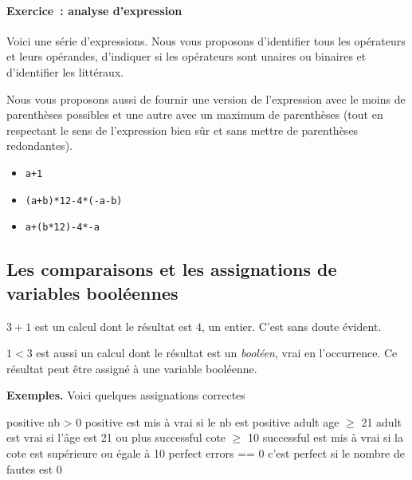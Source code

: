 			\begin{Emphase}
				\paragraph{Exercice~: analyse d’expression}
				
				Voici une série d’expressions. Nous vous proposons d’identifier
				tous les opérateurs et leurs opérandes, d’indiquer si les
				opérateurs sont unaires ou binaires et d’identifier les
				littéraux.  
				
				Nous vous proposons aussi de fournir une version de
				l’expression avec le moins de parenthèses possibles et une autre
				avec un maximum de parenthèses (tout en respectant le sens de
				l’expression bien sûr et sans mettre de parenthèses redondantes).
				
				\begin{itemize}
				\item \Verb_a+1_
				\item \Verb_(a+b)*12-4*(-a-b)_ 
				\item \Verb_a+(b*12)-4*-a_ 
				\end{itemize}
			\end{Emphase}
		

		\subsection{Les comparaisons et les assignations de variables booléennes}
		
			$3+1$ est un calcul dont le résultat est $4$, un entier. C'est sans
			doute évident.
			
			$1<3$ est aussi un calcul dont le résultat est un \emph{booléen},
			vrai en l’occurrence.  Ce résultat peut être assigné à une variable
			booléenne.			

			\textbf{Exemples.}
			Voici quelques assignations correctes 
			
			\begin{pseudocode}
				\Let positive \Gets nb > 0 
					\RComment positive est mis à vrai si le nb est positive 
				\Let adult \Gets age $\ge$ 21 
					\RComment adult est vrai si l’âge est 21 ou plus
				\Let successful \Gets cote $\ge$ 10 
					\RComment successful est mis à vrai si la cote est 
					\RComment supérieure ou égale à 10
				\Let perfect \Gets errors == 0  
					\RComment c’est perfect si le nombre de fautes est 0
			\end{pseudocode}

